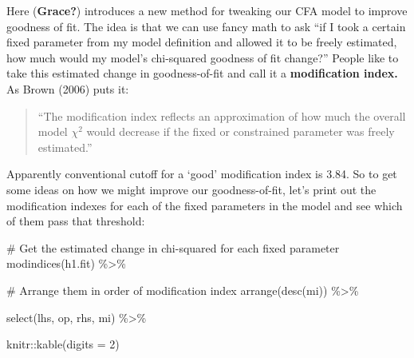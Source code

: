 \documentclass[
  letterpaper,
  DIV=11,
  numbers=noendperiod]{scrreprt}
\newenvironment{Shaded}{\begin{snugshade}}{\end{snugshade}}
\newcommand{\AttributeTok}[1]{\textcolor[rgb]{0.40,0.45,0.13}{#1}}
\newcommand{\CommentTok}[1]{\textcolor[rgb]{0.37,0.37,0.37}{#1}}
\newcommand{\DecValTok}[1]{\textcolor[rgb]{0.68,0.00,0.00}{#1}}
\newcommand{\FunctionTok}[1]{\textcolor[rgb]{0.28,0.35,0.67}{#1}}
\newcommand{\NormalTok}[1]{\textcolor[rgb]{0.00,0.23,0.31}{#1}}
\newcommand{\SpecialCharTok}[1]{\textcolor[rgb]{0.37,0.37,0.37}{#1}}
\begin{document}
Here (\textbf{Grace?}) introduces a new method for tweaking our CFA
model to improve goodness of fit. The idea is that we can use fancy math
to ask ``if I took a certain fixed parameter from my model definition
and allowed it to be freely estimated, how much would my model's
chi-squared goodness of fit change?'' People like to take this estimated
change in goodness-of-fit and call it a \textbf{modification index.} As
Brown (2006) puts it:

\begin{quote}
``The modification index reflects an approximation of how much the
overall model \(χ^2\) would decrease if the fixed or constrained
parameter was freely estimated.''
\end{quote}

Apparently conventional cutoff for a `good' modification index is 3.84.
So to get some ideas on how we might improve our goodness-of-fit, let's
print out the modification indexes for each of the fixed parameters in
the model and see which of them pass that threshold:

\begin{Shaded}
\begin{Highlighting}[]
\CommentTok{\# Get the estimated change in chi{-}squared for each fixed parameter}
\FunctionTok{modindices}\NormalTok{(h1.fit) }\SpecialCharTok{\%\textgreater{}\%} 
  
  \CommentTok{\# Arrange them in order of modification index}
  \FunctionTok{arrange}\NormalTok{(}\FunctionTok{desc}\NormalTok{(mi)) }\SpecialCharTok{\%\textgreater{}\%} 
  
  \FunctionTok{select}\NormalTok{(lhs, op, rhs, mi) }\SpecialCharTok{\%\textgreater{}\%} 
  
\NormalTok{  knitr}\SpecialCharTok{::}\FunctionTok{kable}\NormalTok{(}\AttributeTok{digits =} \DecValTok{2}\NormalTok{)}
\end{Highlighting}
\end{Shaded}
\end{document}
